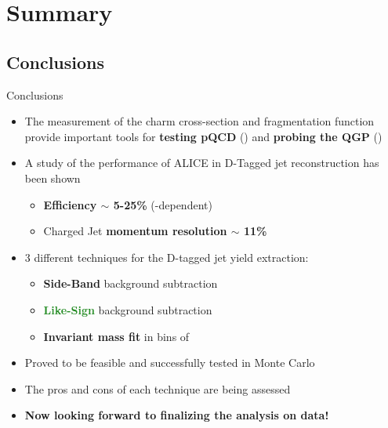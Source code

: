 \documentclass[xcolor={usenames,dvipsnames}]{beamer}
\begin{document}
\section*{Summary}

\subsection*{Conclusions}
\begin{frame}{Conclusions}
\begin{itemize}
\item The measurement of the charm cross-section and fragmentation function provide important tools for
\textbf{\alert{testing pQCD}} (\pp) and \textbf{\alert{probing the QGP}} (\PbPb)
\item A study of the performance of ALICE in D-Tagged jet reconstruction has been shown
\begin{itemize}
\item \textbf{Efficiency $\sim$ 5-25\%} (\ptd-dependent)
\item Charged Jet \textbf{momentum resolution $\sim$ 11\%}
\end{itemize}
\item 3 different techniques for the D-tagged jet yield extraction:
\begin{itemize}
\item \textbf{\textcolor{BrickRed}{Side-Band}} background subtraction
\item \textbf{\textcolor{ForestGreen}{Like-Sign}} background subtraction
\item \textbf{\textcolor{NavyBlue}{Invariant mass fit}} in bins of \ptchjet
\end{itemize}
\item Proved to be \alert{feasible} and \alert{successfully tested} in Monte Carlo
\item The pros and cons of each technique are being assessed
\item \textbf{\alert{Now looking forward to finalizing the analysis on data!}}
\end{itemize}
\end{frame}
\end{document}
